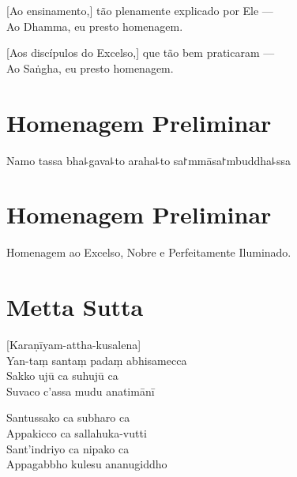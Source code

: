[Ao ensinamento,] tão plenamente explicado por Ele ---\\
 Ao Dhamma, eu presto homenagem. 

[Aos discípulos do Excelso,] que tão bem praticaram ---\\
Ao Saṅgha, eu presto homenagem. 

\clearpage

\chapter*{Homenagem Preliminar}

\begin{leader}
\end{leader}

Namo tassa bha꜕gava꜕to araha꜕to sa꜓mmāsa꜓mbuddha꜕ssa


\chapter{Homenagem Preliminar}

\begin{leader}
\end{leader}

Homenagem ao Excelso, Nobre e Perfeitamente Iluminado.


\clearpage

\chapter*[Metta Sutta]{Metta Sutta}

\delegateSetUseNext


\begin{leader}
\end{leader}

[Karaṇīyam-attha-kusalena]\\
Yan-taṃ santaṃ padaṃ abhisamecca\\
Sakko ujū ca suhujū ca\\
Suvaco c'assa mudu anatimānī

Santussako ca subharo ca\\
Appakicco ca sallahuka-vutti\\
Sant'indriyo ca nipako ca\\
Appagabbho kulesu ananugiddho

